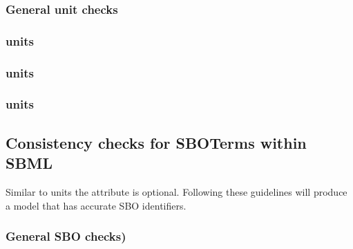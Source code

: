 \subsubsection*{General unit checks} \begin{sbmlenum}



\end{sbmlenum} \subsubsection*{ units} \begin{sbmlenum}


\end{sbmlenum} \subsubsection*{ units} \begin{sbmlenum}


\end{sbmlenum} \subsubsection*{ units} \begin{sbmlenum}


\end{sbmlenum}

\subsection{Consistency checks for SBOTerms within SBML}

Similar to units the  attribute is optional.  Following these
guidelines will produce a model that has accurate SBO identifiers.

\subsubsection*{General SBO checks)} \begin{sbmlenum}


\end{sbmlenum}